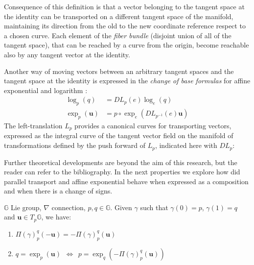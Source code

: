 Consequence of this definition is that a vector belonging to the tangent space at the identity can be transported on a different tangent space of the manifold, maintaining its direction from the old to the new coordinate reference respect to a chosen curve. Each element of the \emph{fiber bundle} (disjoint union of all of the tangent space), that can be reached by a curve from the origin, become reachable also by any tangent vector at the identity.

Another way of moving vectors between an arbitrary tangent spaces and the tangent space at the identity is expressed in the \emph{change of base formulas} for affine exponential and logarithm \cite{arsigny2006bi}:
\begin{align}\label{eq:DL_DR}
\log _{p}(q)  &= DL_{p}(e) \log _{e}(q)  \\
\exp _{p}(\mathbf{u})  &= p\circ \exp_{e} (DL_{p^{-1}}(e) \mathbf{u})
\end{align}
The left-translation $L_{p}$ provides a canonical curves for transporting vectors, expressed as the integral curve of the tangent vector field on the manifold of transformations defined by the push forward of $L_{p}$, indicated here with $DL_{p}$:

Further theoretical developments are beyond the aim of this research, but the reader can refer to the bibliography.
In the next properties we explore how did parallel transport and affine exponential behave when expressed as a composition and when there is a change of signs.
\begin{prop}[Inversion]
	$\mathbb{G}$ Lie group, $\nabla$ connection, $p,q\in\mathbb{G}$. Given $\gamma$ such that $\gamma(0)= p$, $\gamma(1)=q$ and $\mathbf{u}\in T_{p}\mathbb{G}$, we have:
	\begin{enumerate}
	\item $\Pi(\gamma)_{p}^{q}(-\mathbf{u}) = -\Pi(\gamma)_{p}^{q}(\mathbf{u})$
	\item $q = \exp_{p}(\mathbf{u}) \phantom{z} \Longleftrightarrow \phantom{z} p = \exp_{q}(-\Pi(\gamma)_{p}^{q}(\mathbf{u}))$
	\end{enumerate}
\end{prop}

